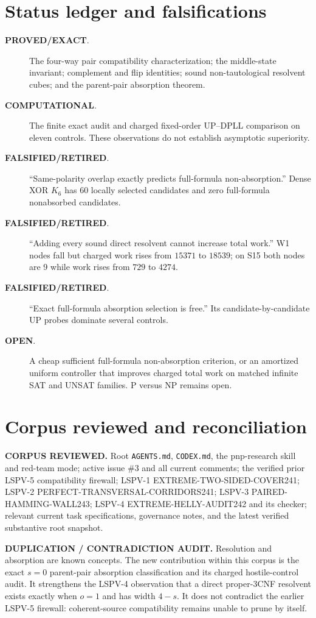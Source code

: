 \documentclass[11pt]{article}
\newcommand{\PROVED}{\textbf{PROVED/EXACT}}
\newcommand{\COMP}{\textbf{COMPUTATIONAL}}
\newcommand{\OPEN}{\textbf{OPEN}}
\newcommand{\FALSE}{\textbf{FALSIFIED/RETIRED}}
\begin{document}
\section{Status ledger and falsifications}
\begin{description}
\item[\PROVED.] The four-way pair compatibility characterization; the middle-state invariant; complement and flip identities; sound non-tautological resolvent cubes; and the parent-pair absorption theorem.
\item[\COMP.] The finite exact audit and charged fixed-order UP--DPLL comparison on eleven controls.  These observations do not establish asymptotic superiority.
\item[\FALSE.] ``Same-polarity overlap exactly predicts full-formula non-absorption.''  Dense XOR $K_6$ has 60 locally selected candidates and zero full-formula nonabsorbed candidates.
\item[\FALSE.] ``Adding every sound direct resolvent cannot increase total work.''  W1 nodes fall but charged work rises from $15371$ to $18539$; on S15 both nodes are 9 while work rises from $729$ to $4274$.
\item[\FALSE.] ``Exact full-formula absorption selection is free.''  Its candidate-by-candidate UP probes dominate several controls.
\item[\OPEN.] A cheap sufficient full-formula non-absorption criterion, or an amortized uniform controller that improves charged total work on matched infinite SAT and UNSAT families.  P versus NP remains open.
\end{description}

\section{Corpus reviewed and reconciliation}
\textbf{CORPUS REVIEWED.}  Root \texttt{AGENTS.md}, \texttt{CODEX.md}, the pnp-research skill and red-team mode; active issue \#3 and all current comments; the verified prior LSPV-5 compatibility firewall; LSPV-1 EXTREME-TWO-SIDED-COVER241; LSPV-2 PERFECT-TRANSVERSAL-CORRIDORS241; LSPV-3 PAIRED-HAMMING-WALL243; LSPV-4 EXTREME-HELLY-AUDIT242 and its checker; relevant current task specifications, governance notes, and the latest verified substantive root snapshot.

\textbf{DUPLICATION / CONTRADICTION AUDIT.}  Resolution and absorption are known concepts.  The new contribution within this corpus is the exact $s=0$ parent-pair absorption classification and its charged hostile-control audit.  It strengthens the LSPV-4 observation that a direct proper-3CNF resolvent exists exactly when $o=1$ and has width $4-s$.  It does not contradict the earlier LSPV-5 firewall: coherent-source compatibility remains unable to prune by itself.
\end{document}
